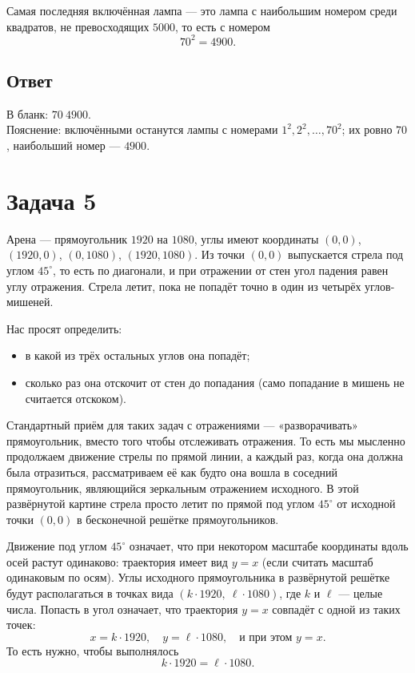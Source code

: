 \documentclass[12pt,a4paper]{article}
\begin{document}
Самая последняя включённая лампа --- это лампа с наибольшим номером среди квадратов, не превосходящих $5000$, то есть с номером
\[
70^2 = 4900.
\]

\subsection*{Ответ}
В бланк: $70\ 4900$.\\
Пояснение: включёнными останутся лампы с номерами $1^2, 2^2, \dots, 70^2$; их ровно $70$, наибольший номер --- $4900$.

\newpage

\section*{Задача 5}

Арена --- прямоугольник $1920$ на $1080$, углы имеют координаты $(0,0)$, $(1920,0)$, $(0,1080)$, $(1920,1080)$. Из точки $(0,0)$ выпускается стрела под углом $45^\circ$, то есть по диагонали, и при отражении от стен угол падения равен углу отражения. Стрела летит, пока не попадёт точно в один из четырёх углов-мишеней.

Нас просят определить:
\begin{itemize}
  \item в какой из трёх остальных углов она попадёт;
  \item сколько раз она отскочит от стен до попадания (само попадание в мишень не считается отскоком).
\end{itemize}

Стандартный приём для таких задач с отражениями --- «разворачивать» прямоугольник, вместо того чтобы отслеживать отражения. То есть мы мысленно продолжаем движение стрелы по прямой линии, а каждый раз, когда она должна была отразиться, рассматриваем её как будто она вошла в соседний прямоугольник, являющийся зеркальным отражением исходного. В этой развёрнутой картине стрела просто летит по прямой под углом $45^\circ$ от исходной точки $(0,0)$ в бесконечной решётке прямоугольников.

Движение под углом $45^\circ$ означает, что при некотором масштабе координаты вдоль осей растут одинаково: траектория имеет вид $y = x$ (если считать масштаб одинаковым по осям). Углы исходного прямоугольника в развёрнутой решётке будут располагаться в точках вида $(k \cdot 1920,\ \ell \cdot 1080)$, где $k$ и $\ell$ --- целые числа. Попасть в угол означает, что траектория $y = x$ совпадёт с одной из таких точек:
\[
x = k \cdot 1920, \quad y = \ell \cdot 1080, \quad \text{и при этом } y = x.
\]
То есть нужно, чтобы выполнялось
\[
k \cdot 1920 = \ell \cdot 1080.
\]
\end{document}
